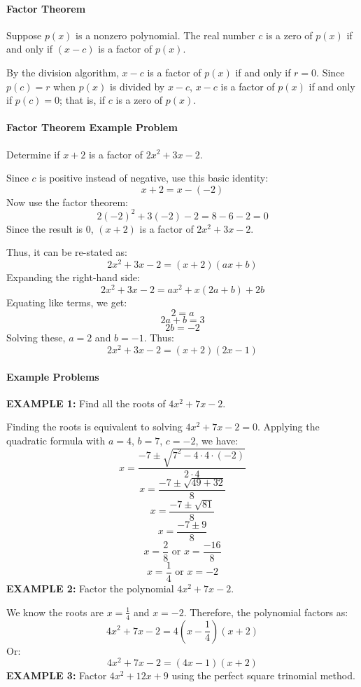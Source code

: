 \paragraph{Factor Theorem}

Suppose $p(x)$ is a nonzero polynomial. The real number $c$ is a zero of $p(x)$ if and only if $(x - c)$ is a factor of $p(x)$.

By the division algorithm, $x - c$ is a factor of $p(x)$ if and only if $r = 0$. Since $p(c) = r$ when $p(x)$ is divided by $x - c$, $x - c$ is a factor of $p(x)$ if and only if $p(c) = 0$; that is, if $c$ is a zero of $p(x)$.

\paragraph{Factor Theorem Example Problem}

Determine if $x + 2$ is a factor of $2x^2 + 3x - 2$.

Since $c$ is positive instead of negative, use this basic identity:
$$
x + 2 = x - (-2)
$$
Now use the factor theorem:
$$
2(-2)^2 + 3(-2) - 2 = 8 - 6 - 2 = 0
$$
Since the result is 0, $(x + 2)$ is a factor of $2x^2 + 3x - 2$.

Thus, it can be re-stated as:
$$
2x^2 + 3x - 2 = (x + 2)(ax + b)
$$
Expanding the right-hand side:
$$
2x^2 + 3x - 2 = ax^2 + x(2a + b) + 2b
$$
Equating like terms, we get:
$$
2 = a
$$
$$
2a + b = 3
$$
$$
2b = -2
$$
Solving these, $a = 2$ and $b = -1$. Thus:
$$
2x^2 + 3x - 2 = (x + 2)(2x - 1)
$$
\paragraph{Example Problems}

\textbf{EXAMPLE 1:} Find all the roots of $4x^2 + 7x - 2$.

Finding the roots is equivalent to solving $4x^2 + 7x - 2 = 0$. Applying the quadratic formula with $a = 4$, $b = 7$, $c = -2$, we have:
$$
x = \frac{-7 \pm \sqrt{7^2 - 4 \cdot 4 \cdot (-2)}}{2 \cdot 4}
$$
$$
x = \frac{-7 \pm \sqrt{49 + 32}}{8}
$$
$$
x = \frac{-7 \pm \sqrt{81}}{8}
$$
$$
x = \frac{-7 \pm 9}{8}
$$
$$
x = \frac{2}{8} \text{ or } x = \frac{-16}{8}
$$
$$
x = \frac{1}{4} \text{ or } x = -2
$$
\textbf{EXAMPLE 2:} Factor the polynomial $4x^2 + 7x - 2$.

We know the roots are $x = \frac{1}{4}$ and $x = -2$. Therefore, the polynomial factors as:
$$
4x^2 + 7x - 2 = 4(x - \frac{1}{4})(x + 2)
$$
Or:
$$
4x^2 + 7x - 2 = (4x - 1)(x + 2)
$$
\textbf{EXAMPLE 3:} Factor $4x^2 + 12x + 9$ using the perfect square trinomial method.

